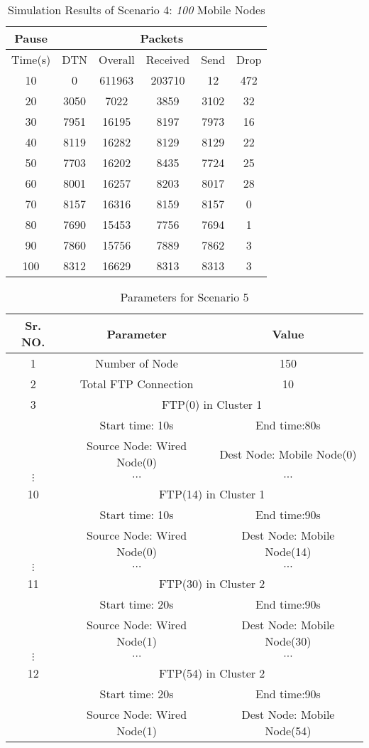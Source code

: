 \documentclass[3p,times]{elsarticle}
\begin{document}
\begin{table}[t!]
\centering
\caption{Simulation Results of Scenario 4: \emph{100} Mobile Nodes}
\label{t10}
\begin{tabular}{|c|c|c|c|c|c|}
\hline
Pause  & \multicolumn{5}{c|}{Packets} \\
\hline
Time(s) & DTN   & Overall & Received & Send & Drop \\
\hline
10 & 0 & 611963 & 203710 & 12 & 472\\
20 & 3050 & 7022 & 3859 & 3102 & 32\\
30 & 7951 & 16195 & 8197 & 7973 & 16\\
40 & 8119 & 16282 & 8129 & 8129 & 22\\
50 & 7703 & 16202 & 8435 & 7724 & 25\\
60 & 8001 & 16257 & 8203 & 8017 & 28\\
70 & 8157 & 16316 & 8159 & 8157 & 0\\
80 & 7690 & 15453 & 7756 & 7694 & 1\\
90 & 7860 & 15756 & 7889 & 7862 & 3\\
100 & 8312 & 16629 & 8313 & 8313 & 3\\
\hline
\end{tabular}
\end{table}


\begin{table}[t]
\centering
\caption{Parameters for Scenario 5}
\label{t11}
\begin{tabular}{|c|c|c|}
\hline
Sr. NO. & Parameter & Value \\
\hline
1 & Number of Node & 150 \\
2& Total FTP Connection & 10 \\
\hline
3 & \multicolumn{2}{|c|}{ FTP(0) in Cluster 1} \\
 & Start time: 10s &  End time:80s\\
 & Source Node: Wired Node(0) & Dest Node: Mobile Node(0) \\
$ \vdots $ & $ \cdots $ & $ \cdots $ \\
\hline
10 & \multicolumn{2}{|c|}{ FTP(14) in Cluster 1} \\
 & Start time: 10s &  End time:90s\\
 & Source Node: Wired Node(0) & Dest Node: Mobile Node(14) \\
\hline
$ \vdots $ & $ \cdots $ & $ \cdots $ \\
\hline
11 & \multicolumn{2}{|c|}{ FTP(30) in Cluster 2} \\
 & Start time: 20s &  End time:90s\\
 & Source Node: Wired Node(1) & Dest Node: Mobile Node(30) \\
\hline
$ \vdots $ & $ \cdots $ & $ \cdots $ \\
\hline
12 & \multicolumn{2}{|c|}{ FTP(54) in Cluster 2} \\
 & Start time: 20s &  End time:90s\\
 & Source Node: Wired Node(1) & Dest Node: Mobile Node(54) \\
\hline
\end{tabular}
\end{table}
\end{document}
